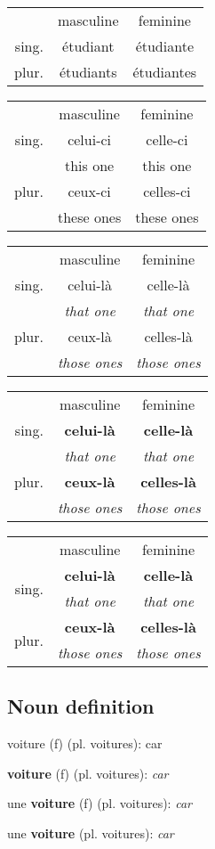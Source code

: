 \documentclass[a4paper,11pt,oneside]{book}
\newcommand{\noundeclb}[4]{
\begin{center}
\begin{tabular}{rcc}
 & masculine & feminine \\
sing. & #1 & #2 \\
plur. & #3 & #4
\end{tabular}
\end{center}
}
\newcommand{\noundecltra}[8]{
\begin{tabular}{rcc}
 & masculine & feminine \\
sing. & #1 & #2 \\
& #3 & #4 \\
plur. & #5 & #6 \\
& #7 & #8
\end{tabular}
}
\newcommand{\noundecltrb}[8]{
\begin{tabular}{rcc}
 & masculine & feminine \\
sing. & #1 & #2 \\
& \textit{#3} & \textit{#4} \\
plur. & #5 & #6 \\
& \textit{#7} & \textit{#8}
\end{tabular}
}
\newcommand{\noundecltrc}[8]{
\begin{tabular}{rcc}
 & masculine & feminine \\
 sing. & \textbf{#1} & \textbf{#2} \\
& \textit{#3} & \textit{#4} \\
plur. & \textbf{#5} & \textbf{#6} \\
& \textit{#7} & \textit{#8}
\end{tabular}
}
\newcommand{\noundecltrd}[8]{
\begin{tabular}{rcc}
 & masculine & feminine \\
 \multirow{2}{*}{sing.} & \textbf{#1} & \textbf{#2} \\
& \textit{#3} & \textit{#4} \\
 \multirow{2}{*}{plur.} & \textbf{#5} & \textbf{#6} \\
& \textit{#7} & \textit{#8}
\end{tabular}
}
\newcommand{\noundefa}[4]{#1 (#3) (pl. #2): #4}
\newcommand{\noundefb}[4]{\textbf{#1} (#3) (pl. #2): \textit{#4}}
\newcommand{\noundefc}[5]{#1 \textbf{#2} (#4) (pl. #3): \textit{#5}}
\newcommand{\noundefd}[4]{#3 \textbf{#1} (pl. #2): \textit{#4}}
\begin{document}
\noundeclb{étudiant}{étudiante}{étudiants}{étudiantes}

\begin{center}
\noundecltra{celui-ci}{celle-ci}{this one}{this one}{ceux-ci}{celles-ci}{these ones}{these ones}
\quad
\noundecltrb{celui-là}{celle-là}{that one}{that one}{ceux-là}{celles-là}{those ones}{those ones}
\end{center}

\noundecltrc{celui-là}{celle-là}{that one}{that one}{ceux-là}{celles-là}{those ones}{those ones}

\noundecltrd{celui-là}{celle-là}{that one}{that one}{ceux-là}{celles-là}{those ones}{those ones}

\subsection{Noun definition}

\noundefa{voiture}{voitures}{f}{car}

\noundefb{voiture}{voitures}{f}{car}

\noundefc{une}{voiture}{voitures}{f}{car}

\noundefd{voiture}{voitures}{une}{car}
\end{document}
